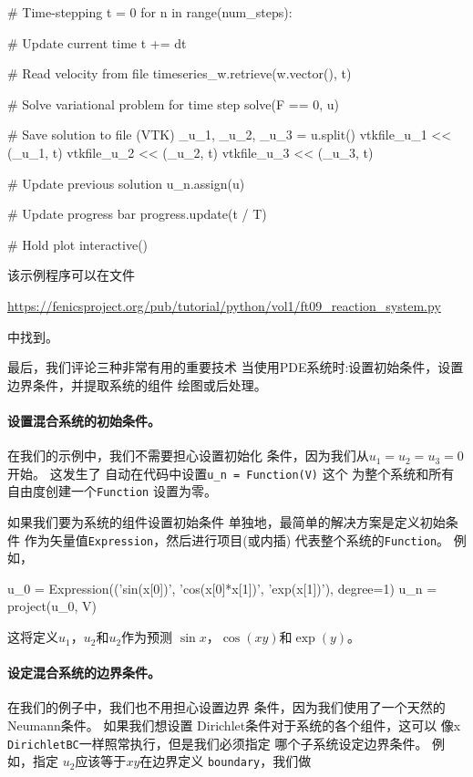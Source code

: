 \begin{python}
# Time-stepping
t = 0
for n in range(num_steps):

    # Update current time
    t += dt

    # Read velocity from file
    timeseries_w.retrieve(w.vector(), t)

    # Solve variational problem for time step
    solve(F == 0, u)

    # Save solution to file (VTK)
    _u_1, _u_2, _u_3 = u.split()
    vtkfile_u_1 << (_u_1, t)
    vtkfile_u_2 << (_u_2, t)
    vtkfile_u_3 << (_u_3, t)

    # Update previous solution
    u_n.assign(u)

    # Update progress bar
    progress.update(t / T)

# Hold plot
interactive()
\end{python}
该示例程序可以在文件
\begin{center}
\url{https://fenicsproject.org/pub/tutorial/python/vol1/ft09_reaction_system.py}
\end{center}
中找到。


最后，我们评论三种非常有用的重要技术
当使用PDE系统时:设置初始条件，设置
边界条件，并提取系统的组件
绘图或后处理。

\paragraph{设置混合系统的初始条件。}

在我们的示例中，我们不需要担心设置初始化
条件，因为我们从$u_1 = u_2 = u_3 = 0$开始。 这发生了
自动在代码中设置\verb!u_n = Function(V)! 这个
为整个系统和所有自由度创建一个\texttt{Function}
设置为零。

如果我们要为系统的组件设置初始条件
单独地，最简单的解决方案是定义初始条件
作为矢量值\texttt{Expression}，然后进行项目(或内插)
代表整个系统的\texttt{Function}。 例如，

\begin{python}
u_0 = Expression(('sin(x[0])', 'cos(x[0]*x[1])', 'exp(x[1])'), degree=1)
u_n = project(u_0, V)
\end{python}
这将定义$u_1$，$u_2$和$u_2$作为预测
$\sin x$，$\cos (xy)$和$\exp(y)$。

\paragraph{设定混合系统的边界条件。}
在我们的例子中，我们也不用担心设置边界
条件，因为我们使用了一个天然的Neumann条件。 如果我们想设置
Dirichlet条件对于系统的各个组件，这可以
像x \texttt{DirichletBC}一样照常执行，但是我们必须指定
哪个子系统设定边界条件。 例如，指定
$u_2$应该等于$xy$在边界定义
\texttt{boundary}，我们做

